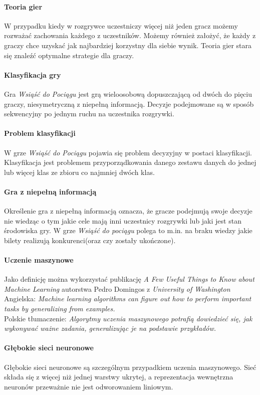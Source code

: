 \documentclass[12pt, oneside]{report}
\begin{document}
\paragraph{Teoria gier} W przypadku kiedy w rozgrywce uczestniczy więcej niż jeden gracz możemy rozważać zachowania każdego z uczestników. Możemy również założyć, że każdy z graczy chce uzyskać jak najbardziej korzystny dla siebie wynik. Teoria gier stara się znaleźć optymalne strategie dla graczy.
\paragraph{Klasyfikacja gry}
Gra \textit{Wsiąść do Pociągu} jest grą wieloosobową dopuszczającą od dwóch do pięciu graczy, niesymetryczną z niepełną informacją. Decyzje podejmowane są w sposób sekwencyjny po jednym ruchu na uczestnika rozgrywki.
\paragraph{Problem klasyfikacji}
W grze \textit{Wsiąść do Pociągu} pojawia się problem decyzyjny w postaci klasyfikacji. Klasyfikacja jest problemem przyporządkowania danego zestawu danych do jednej lub więcej klas ze zbioru co najmniej dwóch klas.
\paragraph{Gra z niepełną informacją} 
Określenie gra z niepełną informacją oznacza, że gracze podejmują swoje decyzje nie wiedząc o tym jakie cele mają inni uczestnicy rozgrywki lub jaki jest stan środowiska gry. W grze \textit{Wsiąść do pociągu} polega to m.in. na braku wiedzy jakie bilety realizują konkurenci(oraz czy zostały ukończone).
\paragraph{Uczenie maszynowe} Jako definicję można wykorzystać publikację \textit{A Few Useful Things to Know about Machine Learning} autorstwa Pedro Domingos z \textit{University of Washington} \\
Angielska:  \textit{Machine learning algorithms can figure out how to perform important tasks by generalizing from examples.} \\
Polskie tłumaczenie: \textit{Algorytmy uczenia maszynowego potrafią dowiedzieć się, jak wykonywać ważne zadania, generalizując je na podstawie przykładów.}
\paragraph{Głębokie sieci neuronowe}
Głębokie sieci neuronowe są szczególnym przypadkiem uczenia maszynowego. Sieć składa się z więcej niż jednej warstwy ukrytej, a reprezentacja wewnętrzna neuronów przeważnie nie jest odworowaniem liniowym.
\end{document}
